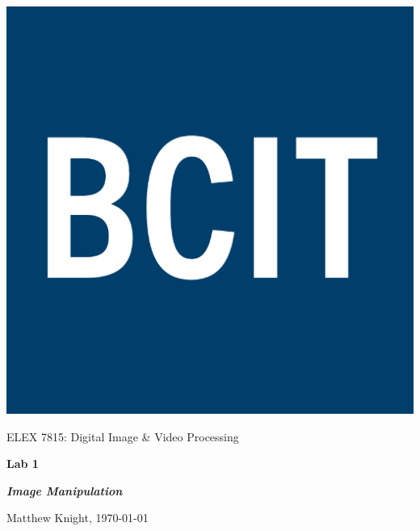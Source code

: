 \documentclass[12pt]{article}
\begin{document}
 

\thispagestyle{titlePage}

\includegraphics[scale=0.12]{BCIT}
\bigskip

\begin{center}
    
    {\fontsize{24pt}{6pt}\selectfont ELEX 7815: Digital Image \& Video Processing}
    
    \vspace{12pt}
    
    {\fontsize{28pt}{12pt}\selectfont\bfseries Lab 1}
    
    \vspace{12pt}
    
    {\fontsize{26pt}{12pt}\selectfont\bfseries\itshape Image Manipulation}
    
    \vspace{12pt}
    
    {\fontsize{16pt}{12pt}\selectfont Matthew Knight, \today}
    
    \vspace{24pt}

\end{center}



\pagebreak

\pagestyle{neilReport}

\tableofcontents

\pagebreak



 



 

\pagebreak

\appendix


\end{document}
